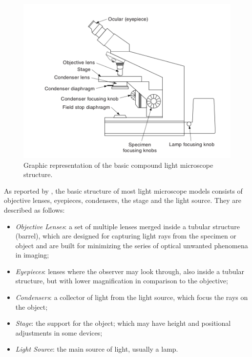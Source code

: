 \begin{figure}[H]
	\centering
	\caption{\label{fig:compound_microscope} Graphic representation of the basic compound light microscope structure.}
	\begin{center}
	    \includegraphics[scale=0.4]{images/fig5.png}
	\end{center}
	\centering
\end{figure}

As reported by , the basic structure of most light microscope models consists of objective lenses, eyepieces, condensers, the stage and the light source. They are described as follows:

\begin{itemize}
    
    \item \emph{Objective Lenses}: a set of multiple lenses merged inside a tubular structure (barrel), which are designed for capturing light rays from the specimen or object and are built for minimizing the series of optical unwanted phenomena in imaging;

    \item \emph{Eyepieces}: lenses where the observer may look through, also inside a tubular structure, but with lower magnification in comparison to the objective;

    \item \emph{Condensers}: a collector of light from the light source, which focus the rays on the object;
    
    \item \emph{Stage}: the support for the object; which may have height and positional adjustments in some devices;
    
    \item \emph{Light Source}: the main source of light, usually a lamp.
\end{itemize}

